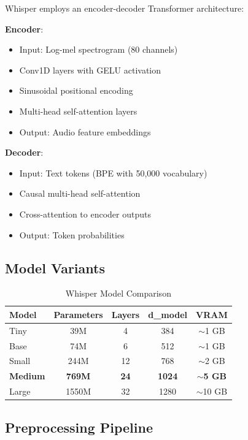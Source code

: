 \documentclass[11pt,a4paper]{article}
\begin{document}
Whisper employs an encoder-decoder Transformer architecture:

\textbf{Encoder}:
\begin{itemize}
    \item Input: Log-mel spectrogram (80 channels)
    \item Conv1D layers with GELU activation
    \item Sinusoidal positional encoding
    \item Multi-head self-attention layers
    \item Output: Audio feature embeddings
\end{itemize}

\textbf{Decoder}:
\begin{itemize}
    \item Input: Text tokens (BPE with 50,000 vocabulary)
    \item Causal multi-head self-attention
    \item Cross-attention to encoder outputs
    \item Output: Token probabilities
\end{itemize}

\subsection{Model Variants}

\begin{table}[htbp]
\centering
\caption{Whisper Model Comparison}
\begin{tabular}{@{}lcccc@{}}
\toprule
\textbf{Model} & \textbf{Parameters} & \textbf{Layers} & \textbf{d\_model} & \textbf{VRAM} \\ \midrule
Tiny & 39M & 4 & 384 & $\sim$1 GB \\
Base & 74M & 6 & 512 & $\sim$1 GB \\
Small & 244M & 12 & 768 & $\sim$2 GB \\
\textbf{Medium} & \textbf{769M} & \textbf{24} & \textbf{1024} & \textbf{$\sim$5 GB} \\
Large & 1550M & 32 & 1280 & $\sim$10 GB \\
\bottomrule
\end{tabular}
\end{table}

\subsection{Preprocessing Pipeline}
\end{document}
